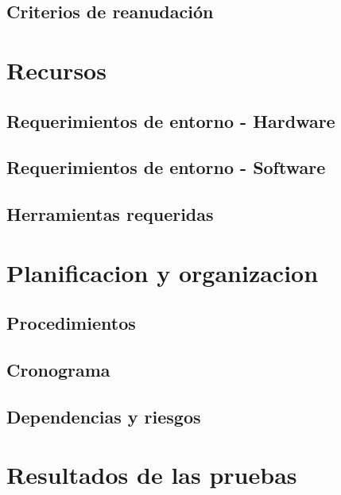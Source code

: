 \subsection{Criterios de reanudación}

\section{Recursos}
\subsection{Requerimientos de entorno - Hardware}

\subsection{Requerimientos de entorno - Software}

\subsection{Herramientas requeridas}

\section{Planificacion y organizacion}
\subsection{Procedimientos}

\subsection{Cronograma}

\subsection{Dependencias y riesgos}

\section{Resultados de las pruebas}